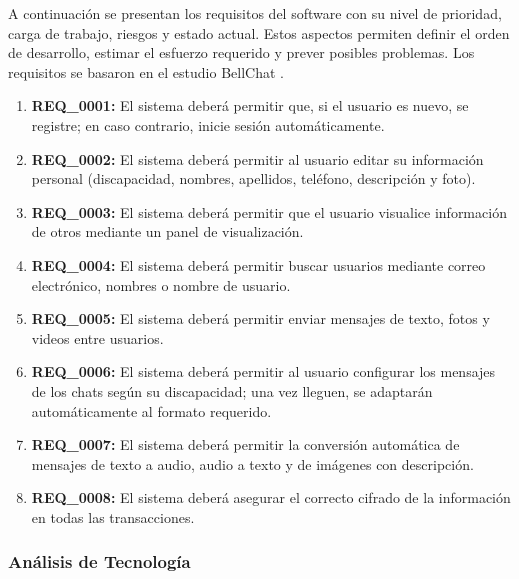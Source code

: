 \documentclass[lettersize,journal]{IEEEtran}
\begin{document}
\begin{itemize}
		\noindent A continuación se presentan los requisitos del software con su nivel de prioridad, carga de trabajo, riesgos y estado actual. Estos aspectos permiten definir el orden de desarrollo, estimar el esfuerzo requerido y prever posibles problemas. Los requisitos se basaron en el estudio BellChat \cite{GuerreroUlloa2024}.
		
		\begin{enumerate}
			\item \textbf{REQ\_0001:} El sistema deberá permitir que, si el usuario es nuevo, se registre; en caso contrario, inicie sesión automáticamente.
			
			\item \textbf{REQ\_0002:} El sistema deberá permitir al usuario editar su información personal (discapacidad, nombres, apellidos, teléfono, descripción y foto).
			
			\item \textbf{REQ\_0003:} El sistema deberá permitir que el usuario visualice información de otros mediante un panel de visualización.
			
			\item \textbf{REQ\_0004:} El sistema deberá permitir buscar usuarios mediante correo electrónico, nombres o nombre de usuario.
			
			\item \textbf{REQ\_0005:} El sistema deberá permitir enviar mensajes de texto, fotos y videos entre usuarios.
			
			\item \textbf{REQ\_0006:} El sistema deberá permitir al usuario configurar los mensajes de los chats según su discapacidad; una vez lleguen, se adaptarán automáticamente al formato requerido.
			
			\item \textbf{REQ\_0007:} El sistema deberá permitir la conversión automática de mensajes de texto a audio, audio a texto y de imágenes con descripción.
			
			\item \textbf{REQ\_0008:} El sistema deberá asegurar el correcto cifrado de la información en todas las transacciones.
		\end{enumerate}

		
\end{itemize}


\subsubsection {Análisis de Tecnología}
\end{document}
